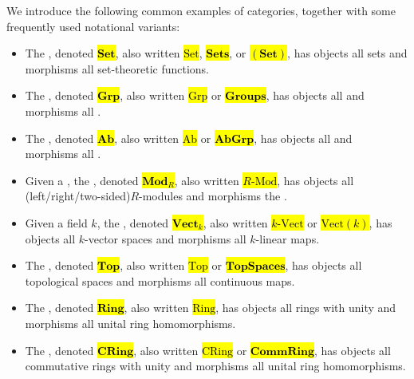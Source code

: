 \begin{definition} \label{definition:examples_of_common_categories}
We introduce the following common examples of categories, together with some frequently used notational variants:

\begin{itemize}
    \item The , denoted \hl{$\mathbf{Set}$}, also written \hl{$\mathrm{Set}$}, \hl{$\mathbf{Sets}$}, or \hl{$(\mathbf{Set})$}, has objects all sets and morphisms all set-theoretic functions.
    \item The , denoted \hl{$\mathbf{Grp}$}, also written \hl{$\mathrm{Grp}$} or \hl{$\mathbf{Groups}$}, has objects all  and morphisms all .
    \item The , denoted \hl{$\mathbf{Ab}$}, also written \hl{$\mathrm{Ab}$} or \hl{$\mathbf{AbGrp}$}, has objects all  and morphisms all .
    \item Given a , the , denoted \hl{$\mathbf{Mod}_R$}, also written \hl{$R\text{-Mod}$}, has objects all (left/right/two-sided)$R$-modules and morphisms the .
    \item Given a field $k$, the , denoted \hl{$\mathbf{Vect}_k$}, also written \hl{$k\text{-Vect}$} or \hl{$\mathrm{Vect}(k)$}, has objects all $k$-vector spaces and morphisms all $k$-linear maps.
    \item The , denoted \hl{$\mathbf{Top}$}, also written \hl{$\mathrm{Top}$} or \hl{$\mathbf{TopSpaces}$}, has objects all topological spaces and morphisms all continuous maps.
    \item The , denoted \hl{$\mathbf{Ring}$}, also written \hl{$\mathrm{Ring}$}, has objects all rings with unity and morphisms all unital ring homomorphisms.
    \item The , denoted \hl{$\mathbf{CRing}$}, also written \hl{$\mathrm{CRing}$} or \hl{$\mathbf{CommRing}$}, has objects all commutative rings with unity and morphisms all unital ring homomorphisms.

\end{itemize}
\end{definition}
